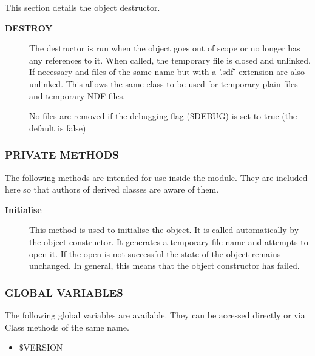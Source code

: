 \begin{description}
This section details the object destructor.

\begin{description}

\item[{\textbf{DESTROY}}] \mbox{}

The destructor is run when the object goes out of scope
or no longer has any references to it. When called, the
temporary file is closed and unlinked. If necessary
and files of the same name but with a '.sdf' extension
are also unlinked. This allows the same class to be used
for temporary plain files and temporary NDF files.



No files are removed if the debugging flag (\$DEBUG) is set to
true (the default is false)

\end{description}
\subsubsection*{PRIVATE METHODS\label{ORAC::TempFile_PRIVATE_METHODS}}


The following methods are intended for use inside the module.
They are included here so that authors of derived classes are
aware of them.

\begin{description}

\item[{\textbf{Initialise}}] \mbox{}

This method is used to initialise the object. It is called
automatically by the object constructor. It generates
a temporary file name and attempts to open it. If the
open is not successful the state of the object remains
unchanged. In general, this means that the object
constructor has failed.

\end{description}
\subsubsection*{GLOBAL VARIABLES\label{ORAC::TempFile_GLOBAL_VARIABLES}}


The following global variables are available.
They can be accessed directly or via Class methods of the same name.

\begin{itemize}

\item \$VERSION


\end{itemize}
\end{description}
